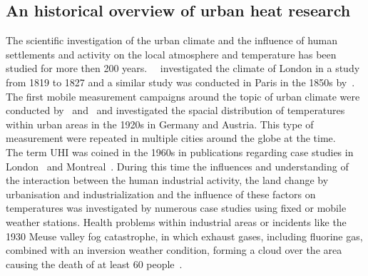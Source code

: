 \documentclass[12pt,a4paper, english,twoside]{scrartcl}
\begin{document}
 \subsection{An historical overview of urban heat research}
  The scientific investigation of the urban climate and the influence of human settlements and activity on the local atmosphere and temperature has been studied for more then 200 years.~%
  \cite{Howard1833}~investigated the climate of London in a study from 1819 to 1827 and a similar study was conducted in Paris in the 1850s by~\cite{renou1862differences}.~%
  The first mobile measurement campaigns around the topic of urban climate were conducted by~\cite{peppler1929auto} and~\cite{tollner1932untersuchungen} and investigated the spacial distribution of temperatures within urban areas  in the 1920s in Germany and Austria. 
  This type of measurement were repeated in multiple cities around the globe at the time.\\
  The term \gls{UHI} was coined in the 1960s in publications regarding case studies in London~\autocite{Chandler1961} and Montreal~\autocite{Oke1968}.
  During this time the influences and understanding of the interaction between the human industrial activity, the land change by urbanisation and industrialization and the influence of these factors on temperatures was investigated by numerous case studies using fixed or mobile weather stations.
  Health problems within industrial areas or incidents like the 1930 Meuse valley fog catastrophe, in which exhaust gases, including fluorine gas, combined with an inversion weather condition, forming a cloud over the area causing the death of at least 60 people~\autocite{Nemery2001}.
\end{document}
